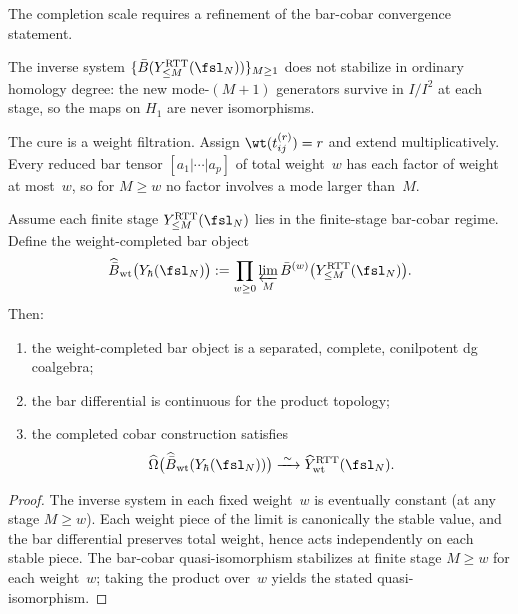 The completion scale requires a refinement of the bar-cobar
convergence statement.

\begin{proposition}
\label{prop:yangian-failure-unweighted}
The inverse system
$\{\bar{B}(Y^{\mathrm{RTT}}_{\le M}(\fsl_N))\}_{M \ge 1}$
does not stabilize in ordinary homology degree: the new
mode-$(M+1)$ generators survive in $I/I^2$ at each stage, so the
maps on $H_1$ are never isomorphisms.
\end{proposition}

The cure is a weight filtration. Assign $\wt(t^{(r)}_{ij}) = r$ and
extend multiplicatively. Every reduced bar tensor
$[a_1|\cdots|a_p]$ of total weight~$w$ has each factor of weight at
most~$w$, so for $M \ge w$ no factor involves a mode larger than~$M$.

\begin{theorem}
\label{thm:yangian-weightwise-MC4}
Assume each finite stage
$Y^{\mathrm{RTT}}_{\le M}(\fsl_N)$ lies in the finite-stage
bar-cobar regime. Define the weight-completed bar object
\begin{equation}
 \widehat{\bar{B}}_{\mathrm{wt}}\bigl(Y_\hbar(\fsl_N)\bigr)
 :=
 \prod_{w \ge 0}\varprojlim_M
 \bar{B}^{(w)}\bigl(Y^{\mathrm{RTT}}_{\le M}(\fsl_N)\bigr).
\end{equation}
Then:
\begin{enumerate}
 \item the weight-completed bar object is a separated, complete,
 conilpotent dg coalgebra;
 \item the bar differential is continuous for the product topology;
 \item the completed cobar construction satisfies
 \begin{equation}
 \widehat\Omega\bigl(
 \widehat{\bar{B}}_{\mathrm{wt}}(Y_\hbar(\fsl_N))
 \bigr)
 \xrightarrow{\;\sim\;}
 \widehat{Y}^{\mathrm{RTT}}_{\mathrm{wt}}(\fsl_N).
 \end{equation}
\end{enumerate}
\end{theorem}

\begin{proof}
The inverse system in each fixed weight~$w$ is eventually constant
(at any stage $M \ge w$). Each weight piece of the limit is
canonically the stable value, and the bar differential preserves
total weight, hence acts independently on each stable piece. The
bar-cobar quasi-isomorphism stabilizes at finite stage $M \ge w$
for each weight~$w$; taking the product over~$w$ yields the
stated quasi-isomorphism.
\end{proof}

